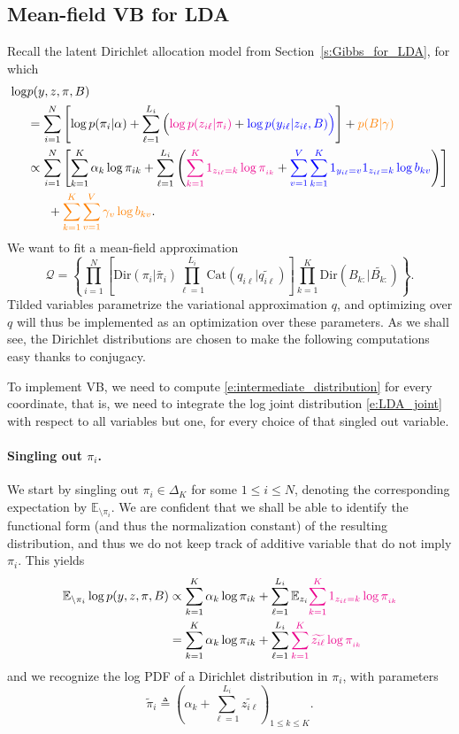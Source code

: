 \subsection{Mean-field VB for LDA}
\label{s:VB_for_LDA}
Recall the latent Dirichlet allocation model from Section~\ref{s:Gibbs_for_LDA}, for which
\begin{align}
\log &p(y, z, \pi, B)\\
&=\sum_{i=1}^N \left[\log p(\pi_i\vert \alpha) + \sum_{\ell=1}^{L_i} \Big(\textcolor{magenta}{\log p(z_{i\ell}\vert\pi_i)} + \textcolor{blue}{\log p(y_{i\ell}\vert z_{i\ell}, B)\Big)}\right] + \textcolor{orange}{p(B\vert \gamma)}\nonumber\\
&\propto \sum_{i=1}^N \left[\sum_{k=1}^K \alpha_k \log \pi_{ik} + \sum_{\ell=1}^{L_i} \left(\textcolor{magenta}{\sum_{k=1}^K 1_{z_{i\ell}=k}\log\pi_{_{ik}}} + \textcolor{blue}{\sum_{v=1}^V \sum_{k=1}^K 1_{y_{i\ell}=v}1_{z_{i\ell}=k} \log b_{kv}}\right)\right] \nonumber\\
&~~~~~+ \textcolor{orange}{\sum_{k=1}^K \sum_{v=1}^V \gamma_v\log b_{kv}}. \label{e:LDA_joint}
\end{align}
We want to fit a mean-field approximation
$$
\mathcal Q = \left\{ \prod_{i=1}^N \left[\text{Dir}(\pi_i\vert\widetilde{\pi_i}) \prod_{\ell=1}^{L_i} \text{Cat}(q_{i\ell}\vert\widetilde{q_{i\ell}}) \right] \prod_{k=1}^K \text{Dir}(B_{k:}\vert \widetilde{B_{k:}}) \right\}.
$$
Tilded variables parametrize the variational approximation $q$, and optimizing over $q$ will thus be implemented as an optimization over these parameters.
As we shall see, the Dirichlet distributions are chosen to make the following computations easy thanks to conjugacy.

To implement VB, we need to compute \eqref{e:intermediate_distribution} for every coordinate, that is, we need to integrate the log joint distribution \eqref{e:LDA_joint} with respect to all variables but one, for every choice of that singled out variable.

\paragraph{Singling out $\pi_i$.}
We start by singling out $\pi_i\in \Delta_K$ for some $1\leq i \leq N$, denoting the corresponding expectation by $\mathbb E_{\setminus \pi_i}$.
We are confident that we shall be able to identify the functional form (and thus the normalization constant) of the resulting distribution, and thus we do not keep track of additive variable that do not imply $\pi_i$.
This yields
\begin{align*}
\mathbb{E}_{\setminus \pi_i} \log p(y,z,\pi, B) &\propto \sum_{k=1}^K \alpha_k \log \pi_{ik} + \sum_{\ell=1}^{L_i} \mathbb{E}_{z_i}\textcolor{magenta}{\sum_{k=1}^K  1_{z_{i\ell}=k}\log\pi_{_{ik}}}\\
&= \sum_{k=1}^K \alpha_k \log \pi_{ik} + \sum_{\ell=1}^{L_i} \textcolor{magenta}{\sum_{k=1}^K \widetilde{z_{i\ell}}\log\pi_{_{ik}}}
\end{align*}
and we recognize the log PDF of a Dirichlet distribution in $\pi_i$, with parameters
$$
\widetilde\pi_i \triangleq \left( \alpha_k + \sum_{\ell=1}^{L_i} \widetilde{z_{i\ell}}  \right)_{1\leq k\leq K}.
$$

